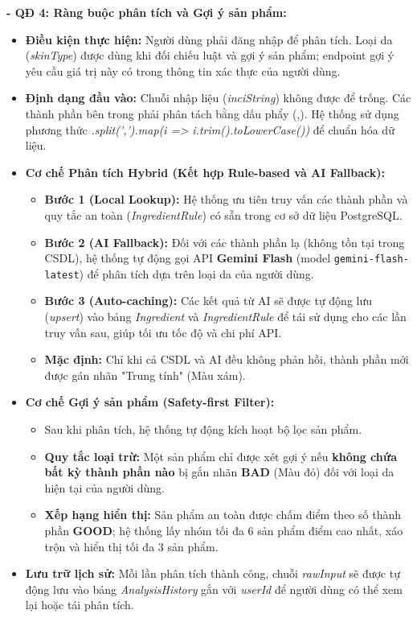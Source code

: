 \documentclass[12pt,a4paper]{article}
\begin{document}
\textbf{- QĐ 4: Ràng buộc phân tích và Gợi ý sản phẩm:}
\begin{itemize}
    \item \textbf{Điều kiện thực hiện:} Người dùng phải đăng nhập để phân tích. Loại da (\textit{skinType}) được dùng khi đối chiếu luật và gợi ý sản phẩm; endpoint gợi ý yêu cầu giá trị này có trong thông tin xác thực của người dùng.
    \item \textbf{Định dạng đầu vào:} Chuỗi nhập liệu (\textit{inciString}) không được để trống. Các thành phần bên trong phải phân tách bằng dấu phẩy (,). Hệ thống sử dụng phương thức \textit{.split(',').map(i => i.trim().toLowerCase())} để chuẩn hóa dữ liệu.
    \item \textbf{Cơ chế Phân tích Hybrid (Kết hợp Rule-based và AI Fallback):} 
    \begin{itemize}
        \item \textbf{Bước 1 (Local Lookup):} Hệ thống ưu tiên truy vấn các thành phần và quy tắc an toàn (\textit{IngredientRule}) có sẵn trong cơ sở dữ liệu PostgreSQL.
        \item \textbf{Bước 2 (AI Fallback):} Đối với các thành phần lạ (không tồn tại trong CSDL), hệ thống tự động gọi API \textbf{Gemini Flash} (model \texttt{gemini-flash-latest}) để phân tích dựa trên loại da của người dùng.
        \item \textbf{Bước 3 (Auto-caching):} Các kết quả từ AI sẽ được tự động lưu (\textit{upsert}) vào bảng \textit{Ingredient} và \textit{IngredientRule} để tái sử dụng cho các lần truy vấn sau, giúp tối ưu tốc độ và chi phí API.
        \item \textbf{Mặc định:} Chỉ khi cả CSDL và AI đều không phản hồi, thành phần mới được gán nhãn "Trung tính" (Màu xám).
    \end{itemize}
    \item \textbf{Cơ chế Gợi ý sản phẩm (Safety-first Filter):}
    \begin{itemize}
        \item Sau khi phân tích, hệ thống tự động kích hoạt bộ lọc sản phẩm. 
        \item \textbf{Quy tắc loại trừ:} Một sản phẩm chỉ được xét gợi ý nếu \textbf{không chứa bất kỳ thành phần nào} bị gắn nhãn \textbf{BAD} (Màu đỏ) đối với loại da hiện tại của người dùng.
        \item \textbf{Xếp hạng hiển thị:} Sản phẩm an toàn được chấm điểm theo số thành phần \textbf{GOOD}; hệ thống lấy nhóm tối đa 6 sản phẩm điểm cao nhất, xáo trộn và hiển thị tối đa 3 sản phẩm.
    \end{itemize}
    \item \textbf{Lưu trữ lịch sử:} Mỗi lần phân tích thành công, chuỗi \textit{rawInput} sẽ được tự động lưu vào bảng \textit{AnalysisHistory} gắn với \textit{userId} để người dùng có thể xem lại hoặc tái phân tích.
\end{itemize}
\end{document}

